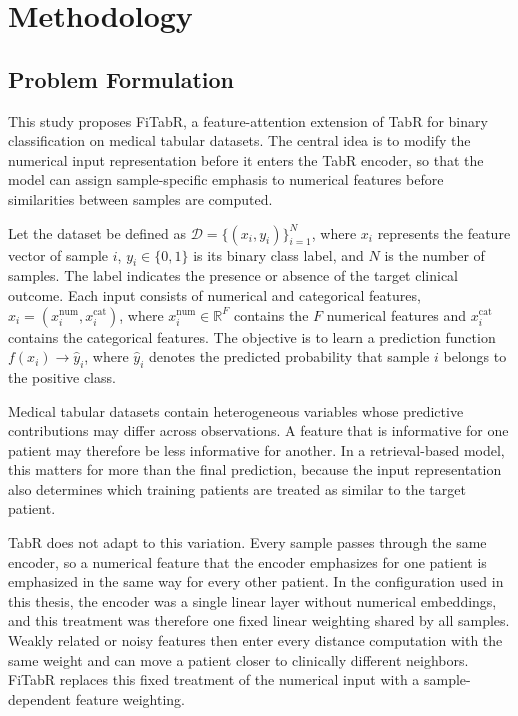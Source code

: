 \documentclass[11pt,a4paper,oneside, openany, reqno, chapter, nokorean]{oblivoir}
\theoremstyle{definition}
\theoremstyle{remark}
\numberwithin{equation}{chapter}
\theoremstyle{definition}
\theoremstyle{remark}
\theoremstyle{definition}
\begin{document}
   \chapter{Methodology}
\label{chap:methodology}

\section{Problem Formulation}
\label{sec:problem}

This study proposes FiTabR, a feature-attention extension of TabR for binary
classification on medical tabular datasets. The central idea is to modify the
numerical input representation before it enters the TabR encoder, so that the
model can assign sample-specific emphasis to numerical features before
similarities between samples are computed.

Let the dataset be defined as $\mathcal{D}=\{(x_i,y_i)\}_{i=1}^{N}$, where
$x_i$ represents the feature vector of sample $i$, $y_i\in\{0,1\}$ is its
binary class label, and $N$ is the number of samples. The label indicates the
presence or absence of the target clinical outcome. Each input consists of
numerical and categorical features,
$x_i=(x_i^{\mathrm{num}},x_i^{\mathrm{cat}})$, where
$x_i^{\mathrm{num}}\in\mathbb{R}^{F}$ contains the $F$ numerical features and
$x_i^{\mathrm{cat}}$ contains the categorical features. The objective is to
learn a prediction function $f(x_i)\rightarrow\hat{y}_i$, where $\hat{y}_i$
denotes the predicted probability that sample $i$ belongs to the positive
class.

Medical tabular datasets contain heterogeneous variables whose predictive
contributions may differ across observations. A feature that is informative
for one patient may therefore be less informative for another. In a
retrieval-based model, this matters for more than the final prediction,
because the input representation also determines which training patients are
treated as similar to the target patient.

TabR does not adapt to this variation. Every sample passes through the same
encoder, so a numerical feature that the encoder emphasizes for one patient is
emphasized in the same way for every other patient. In the configuration used
in this thesis, the encoder was a single linear layer without numerical
embeddings, and this treatment was therefore one fixed linear weighting shared
by all samples. Weakly related or noisy features then enter every distance
computation with the same weight and can move a patient closer to clinically
different neighbors. FiTabR replaces this fixed treatment of the numerical
input with a sample-dependent feature weighting.
\end{document}
